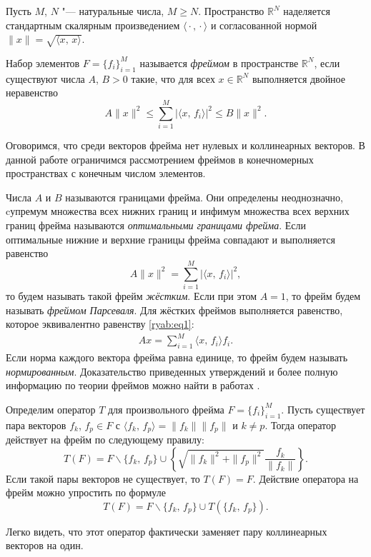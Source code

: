 Пусть $M$, $N$ "--- натуральные числа, $M \geq N.$ 
Пространство $\mathbb{R}^N$ наделяется стандартным
скалярным произведением $\langle {}\cdot{}, {}\cdot{} \rangle$ и согласованной нормой $\|x\|=\sqrt{\langle x,\,x\rangle}.$
\begin{definition}
Набор элементов $F =\{f_i \}_{i=1}^{M}$ называется {\it фреймом} в пространстве $\mathbb{R}^N$, если существуют числа $A$, $B>0$
такие, что для всех $x \in \mathbb{R}^N$ выполняется двойное неравенство
$$
A \|x \|^{2} \leq \sum_{i=1}^M |\langle x,\,f_i \rangle |^{2} \leq B\|x\|^{2}.
$$
\end{definition}
Оговоримся, что среди векторов фрейма нет нулевых и коллинеарных векторов. В данной
работе ограничимся рассмотрением фреймов в конечномерных пространствах с конечным числом элементов.

Числа $A$ и $B$ называются границами фрейма. Они определены неоднозначно, cупремум множества всех нижних границ и инфимум
множества всех верхних границ фрейма называются {\it оптимальными границами фрейма}. Если оптимальные нижние и верхние границы
фрейма совпадают и выполняется равенство
\begin{equation}
\label{ryab:eq1}
A \|x \|^{2} = \sum_{i=1}^M | \langle  x,\,f_i \rangle |^{2},
\end{equation}
то будем называть такой фрейм {\it жёстким}. Если при этом $A = 1$, то фрейм будем называть {\it фреймом Парсеваля}. Для жёстких фреймов выполняется
равенство, которое эквивалентно равенству \eqref{ryab:eq1}:
\begin{align}
\label{ryab:eq11}
Ax = \sum_{i=1}^M \langle x,\, f_i \rangle f_i.
\tag{$1'$}
\end{align}
Если норма каждого вектора фрейма равна единице, то фрейм будем называть {\it нормированным}.
Доказательство приведенных утверждений и более полную информацию по теории фреймов можно
найти в работах \cite{ryabtsov:Cri,ryabtsov:Cas}.

\begin{definition}
Определим оператор $T$ для произвольного фрейма $F = \{f_i \}_{i=1}^M$. Пусть существует пара векторов
$f_k$, $f_p \in F$ с $\langle f_k,\, f_p \rangle = \|f_k \| \|f_p\|$
и $k \neq p$. Тогда оператор действует на фрейм по следующему правилу:
\begin{equation}
\label{ryab:eq2}
T (F ) = F \backslash \{f_k,\,f_p \} \cup \left\{ \sqrt{ \|f_k \|^2 + \|f_p \|^2} \frac{f_k}{\|f_k \|} \right\}.
\end{equation}
Если такой пары векторов не существует, то $T (F ) = F$. Действие оператора на фрейм можно упростить по формуле
\begin{equation}
T (F ) = F \backslash \{f_k,\, f_p \} \cup  T \left( \{f_k,\, f_p \}  \right).
\tag{$2'$}
\end{equation}

Легко видеть, что этот оператор фактически заменяет пару коллинеарных векторов на один.
\end{definition}

